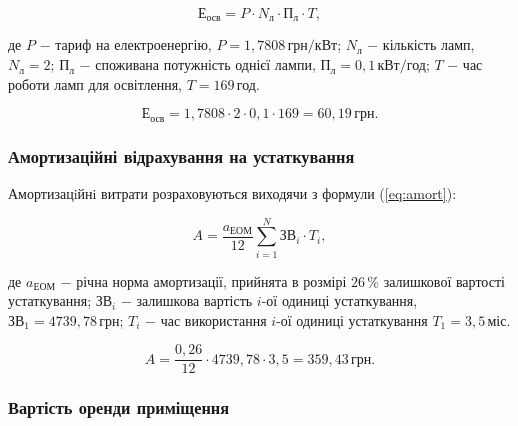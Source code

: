 \begin{equation}\label{eq:osv}
\text{Е}_{\text{осв}} = P \cdot N_{\text{л}} \cdot \text{П}_{\text{л}} \cdot T,
\end{equation}

\noindent де $P$ $-$ тариф на електроенергію, $P = 1,7808 \, \text{грн}/\text{кВт}$; \newline
\hspace*{15pt}$N_{\text{л}}$ $-$ кількість ламп, $N_{\text{л}} = 2$;\newline
\hspace*{15pt}$\text{П}_{\text{л}}$ $-$ споживана потужність однієї лампи, $\text{П}_{\text{л}} = 0,1 \, \text{кВт}/\text{год}$;\newline
\hspace*{15pt}$T$ $-$ час роботи ламп для освітлення, $T = 169 \, \text{год}$.

\[
\text{Е}_{\text{осв}} = 1,7808 \cdot 2 \cdot 0,1 \cdot 169 = 60,19 \, \text{грн}.
\]

\vspace{1.5em}

\subsubsection{Амортизаційні відрахування на устаткування}

Амортизацiйнi витрати розраховуються виходячи з формули (\ref{eq:amort}):

\begin{equation}\label{eq:amort}
A = \frac{a_{\text{ЕОМ}}}{12}\sum_{i=1}^{N}\text{ЗВ}_{i} \cdot T_{i},
\end{equation}

\noindent де $a_{\text{ЕОМ}}$ $-$ річна норма амортизації, прийнята в розмірі $ 26 \, \%$ залишкової вартості устаткування;\newline
\hspace*{23pt}$\text{ЗВ}_{i}$ $-$ залишкова вартість $i$-ої одиниці устаткування, $\text{ЗВ}_{1} = 4739,78 \, \text{грн}$;\newline
\hspace*{23pt}$T_{i}$ $-$ час використання $i$-ої одиниці устаткування $T_{1} = 3,5 \, \text{міс}$.

\[
A = \frac{0,26}{12} \cdot 4739,78 \cdot 3,5 = 359,43 \, \text{грн}.
\]

\vspace{1.5em}

\subsubsection{Вартість оренди приміщення}


